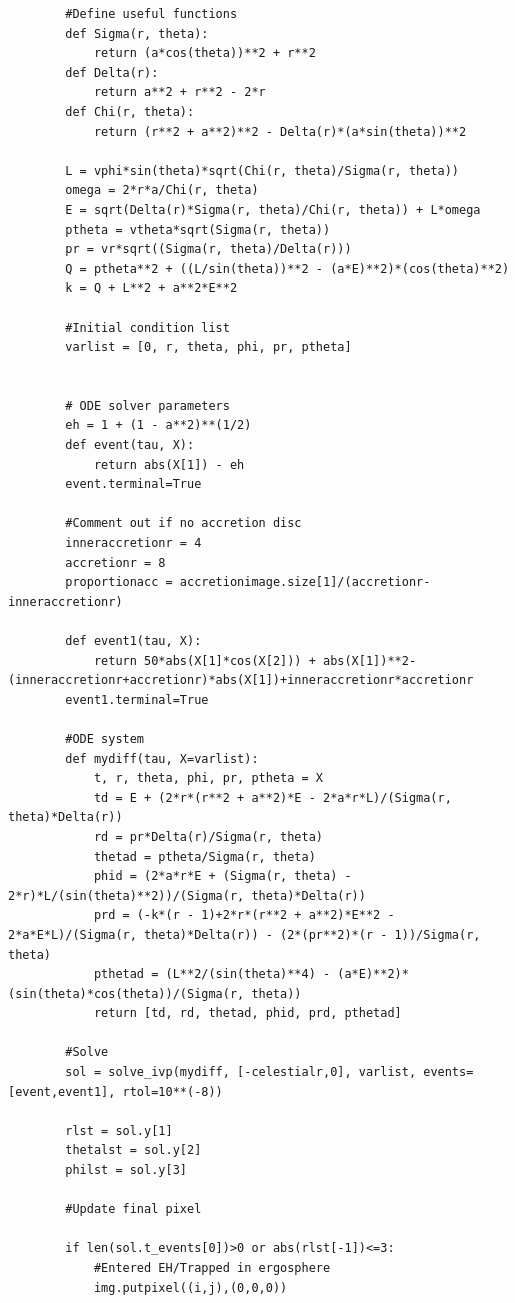 \documentclass[oneside,openright,frontopenright, singlespacing]{dmathesis}
\begin{document}
\begin{lstlisting}
        #Define useful functions
        def Sigma(r, theta):
            return (a*cos(theta))**2 + r**2
        def Delta(r):
            return a**2 + r**2 - 2*r
        def Chi(r, theta):
            return (r**2 + a**2)**2 - Delta(r)*(a*sin(theta))**2

        L = vphi*sin(theta)*sqrt(Chi(r, theta)/Sigma(r, theta))
        omega = 2*r*a/Chi(r, theta)
        E = sqrt(Delta(r)*Sigma(r, theta)/Chi(r, theta)) + L*omega
        ptheta = vtheta*sqrt(Sigma(r, theta))
        pr = vr*sqrt((Sigma(r, theta)/Delta(r)))
        Q = ptheta**2 + ((L/sin(theta))**2 - (a*E)**2)*(cos(theta)**2)
        k = Q + L**2 + a**2*E**2
        
        #Initial condition list
        varlist = [0, r, theta, phi, pr, ptheta]
        
        
        # ODE solver parameters
        eh = 1 + (1 - a**2)**(1/2)
        def event(tau, X):
            return abs(X[1]) - eh
        event.terminal=True
        
        #Comment out if no accretion disc
        inneraccretionr = 4
        accretionr = 8
        proportionacc = accretionimage.size[1]/(accretionr-inneraccretionr)

        def event1(tau, X):
            return 50*abs(X[1]*cos(X[2])) + abs(X[1])**2-(inneraccretionr+accretionr)*abs(X[1])+inneraccretionr*accretionr
        event1.terminal=True
        
        #ODE system
        def mydiff(tau, X=varlist):
            t, r, theta, phi, pr, ptheta = X
            td = E + (2*r*(r**2 + a**2)*E - 2*a*r*L)/(Sigma(r, theta)*Delta(r))
            rd = pr*Delta(r)/Sigma(r, theta)
            thetad = ptheta/Sigma(r, theta)
            phid = (2*a*r*E + (Sigma(r, theta) - 2*r)*L/(sin(theta)**2))/(Sigma(r, theta)*Delta(r))
            prd = (-k*(r - 1)+2*r*(r**2 + a**2)*E**2 - 2*a*E*L)/(Sigma(r, theta)*Delta(r)) - (2*(pr**2)*(r - 1))/Sigma(r, theta)
            pthetad = (L**2/(sin(theta)**4) - (a*E)**2)*(sin(theta)*cos(theta))/(Sigma(r, theta))
            return [td, rd, thetad, phid, prd, pthetad]        

        #Solve
        sol = solve_ivp(mydiff, [-celestialr,0], varlist, events=[event,event1], rtol=10**(-8))

        rlst = sol.y[1]
        thetalst = sol.y[2]
        philst = sol.y[3]
        
        #Update final pixel
        
        if len(sol.t_events[0])>0 or abs(rlst[-1])<=3:
            #Entered EH/Trapped in ergosphere
            img.putpixel((i,j),(0,0,0))
            

\end{lstlisting}
\end{document}
